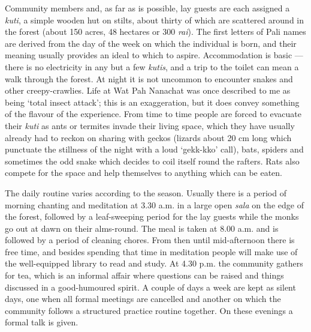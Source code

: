 Community members and, as far as is possible, lay guests are each
assigned a \emph{kuti}, a simple wooden hut on stilts, about thirty of
which are scattered around in the forest (about 150 acres, 48 hectares
or 300 \emph{rai}). The first letters of Pali names are derived from the
day of the week on which the individual is born, and their meaning
usually provides an ideal to which to aspire. Accommodation is basic ---
there is no electricity in any but a few \emph{kutis}, and a trip to the
toilet can mean a walk through the forest. At night it is not uncommon
to encounter snakes and other creepy-crawlies. Life at Wat Pah Nanachat
was once described to me as being `total insect attack'; this is an
exaggeration, but it does convey something of the flavour of the
experience. From time to time people are forced to evacuate their
\emph{kuti} as ants or termites invade their living space, which they
have usually already had to reckon on sharing with geckos (lizards about
20 cm long which punctuate the stillness of the night with a loud
`gekk-kko' call), bats, spiders and sometimes the odd snake which
decides to coil itself round the rafters. Rats also compete for the
space and help themselves to anything which can be eaten.

The daily routine varies according to the season. Usually there is a
period of morning chanting and meditation at 3.30 a.m. in a large open
\emph{sala} on the edge of the forest, followed by a leaf-sweeping
period for the lay guests while the monks go out at dawn on their
alms-round. The meal is taken at 8.00 a.m. and is followed by a period
of cleaning chores. From then until mid-afternoon there is free time,
and besides spending that time in meditation people will make use of the
well-equipped library to read and study. At 4.30 p.m. the community
gathers for tea, which is an informal affair where questions can be
raised and things discussed in a good-humoured spirit. A couple of days
a week are kept as silent days, one when all formal meetings are
cancelled and another on which the community follows a structured
practice routine together. On these evenings a formal talk is given.

